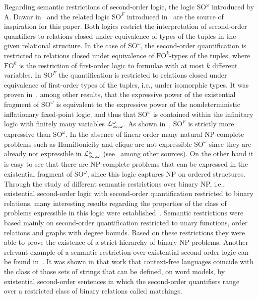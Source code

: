 \documentclass{article}
\begin{document}
Regarding semantic restrictions of second-order logic, the logic $\mathrm{SO}^\omega$ introduced by A. Dawar
in~\cite{Dawar98} and the related logic $\mathrm{SO}^F$ introduced in~\cite{GrossoT10} are the source of inspiration for this paper. Both logics restrict the interpretation of second-order quantifiers to relations closed under equivalence of types of the tuples in the given relational structure. In the case of $\mathrm{SO}^\omega$, the second-order quantification is restricted to relations closed under equivalence of $\mathrm{FO}^k$-types of the tuples, where $\mathrm{FO}^k $ is the restriction of first-order logic to formulae with at most $k$ different variables. In $\mathrm{SO}^F$ the quantification is restricted to relations closed under equivalence of first-order
types of the tuples, i.e., under isomorphic types. It was proven in~\cite{Dawar98}, among other results, that the expressive power of the existential fragment of $\mathrm{SO}^\omega$ is equivalent to the expressive power of the nondeterministic inflationary fixed-point logic, and thus that $\mathrm{SO}^\omega$ is contained within the infinitary logic with finitely many variables ${\cal L}^\omega_{\infty, \omega}$. As shown in~\cite{GrossoT10}, $\mathrm{SO}^F$ is strictly more expressive than $\mathrm{SO}^{\omega}$. In the absence of linear order many natural NP-complete problems such as Hamiltonicity and clique are not expressible $\mathrm{SO}^{\omega}$ since they are already not expressible in ${\cal L}^\omega_{\infty, \omega}$ (see~\cite{Immerman99} among other sources). On the other hand it is easy to
see that there are NP-complete problems that can be expressed in the existential fragment of
$\mathrm{SO}^\omega$, since this logic captures NP on ordered structures. 
Through the study of different semantic restrictions over binary NP, i.e., existential second-order logic with second-order quantification restricted to binary relations, many interesting results regarding the properties of the class of problems expressible in this logic were established~\cite{DurandLS98}. Semantic restrictions were based mainly on second-order quantification restricted to unary functions, order relations and graphs with degree bounds. Based on these restrictions they were able to prove the existence of a strict hierarchy of binary NP problems.
Another relevant example of a semantic restriction over existential second-order logic can
be found in~\cite{LautemannST94}. It was shown in that work that context-free languages coincide with the
class of those sets of strings that can be defined, on word models, by existential second-order
sentences in which the second-order quantifiers range over a restricted class of binary relations
called matchings.
\end{document}
